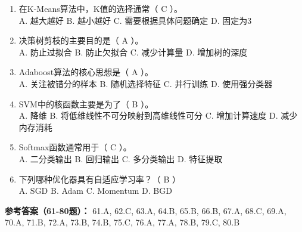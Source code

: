 \begin{enumerate}[resume,leftmargin=2em,itemsep=1pt]
\\ A. 观测序列不可见 B. 状态序列不可见 C. 转移概率未知 D. 发射概率未知
\item 在K-Means算法中，K值的选择通常（ C ）。
\\ A. 越大越好 B. 越小越好 C. 需要根据具体问题确定 D. 固定为3
\item 决策树剪枝的主要目的是（ A ）。
\\ A. 防止过拟合 B. 防止欠拟合 C. 减少计算量 D. 增加树的深度
\item Adaboost算法的核心思想是（ A ）。
\\ A. 关注被错分的样本 B. 随机选择特征 C. 并行训练 D. 使用强分类器
\item SVM中的核函数主要是为了（ B ）。
\\ A. 降维 B. 将低维线性不可分映射到高维线性可分 C. 增加计算速度 D. 减少内存消耗
\item Softmax函数通常用于（ C ）。
\\ A. 二分类输出 B. 回归输出 C. 多分类输出 D. 特征提取
\item 下列哪种优化器具有自适应学习率？（ B ）
\\ A. SGD B. Adam C. Momentum D. BGD
\end{enumerate}

\textbf{参考答案（61-80题）：}
61.A, 62.C, 63.A, 64.B, 65.B, 66.B, 67.A, 68.C, 69.A, 70.A, 
71.B, 72.A, 73.B, 74.B, 75.C, 76.A, 77.A, 78.B, 79.C, 80.B

